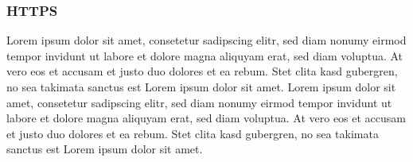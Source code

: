 \newpage
\subsubsection{HTTPS}
Lorem ipsum dolor sit amet, consetetur sadipscing elitr, sed diam nonumy eirmod tempor invidunt ut labore et dolore magna aliquyam erat, sed diam voluptua. At vero eos et accusam et justo duo dolores et ea rebum. Stet clita kasd gubergren, no sea takimata sanctus est Lorem ipsum dolor sit amet. Lorem ipsum dolor sit amet, consetetur sadipscing elitr, sed diam nonumy eirmod tempor invidunt ut labore et dolore magna aliquyam erat, sed diam voluptua. At vero eos et accusam et justo duo dolores et ea rebum. Stet clita kasd gubergren, no sea takimata sanctus est Lorem ipsum dolor sit amet.